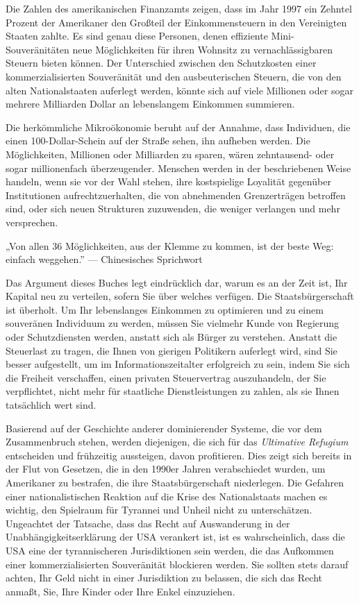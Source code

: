 \documentclass[
  a5paper,
  smalldemyvopaper,10pt,twoside,onecolumn,openright,extrafontsizes,hidelinks]{memoir}
\renewenvironment{quote}%
               {\list{}{\rightmargin=.6cm\leftmargin=.6cm}%
                \itshape \item[]}%
               {\endlist}
\begin{document}
Die Zahlen des amerikanischen Finanzamts zeigen, dass im Jahr 1997 ein
Zehntel Prozent der Amerikaner den Großteil der Einkommensteuern in den
Vereinigten Staaten zahlte. Es sind genau diese Personen, denen
effiziente Mini-Souveränitäten neue Möglichkeiten für ihren Wohnsitz zu
vernachlässigbaren Steuern bieten können. Der Unterschied zwischen den
Schutzkosten einer kommerzialisierten Souveränität und den
ausbeuterischen Steuern, die von den alten Nationalstaaten auferlegt
werden, könnte sich auf viele Millionen oder sogar mehrere Milliarden
Dollar an lebenslangem Einkommen summieren.

Die herkömmliche Mikroökonomie beruht auf der Annahme, dass Individuen,
die einen 100-Dollar-Schein auf der Straße sehen, ihn aufheben werden.
Die Möglichkeiten, Millionen oder Milliarden zu sparen, wären
zehntausend- oder sogar millionenfach überzeugender. Menschen werden in
der beschriebenen Weise handeln, wenn sie vor der Wahl stehen, ihre
kostspielige Loyalität gegenüber Institutionen aufrechtzuerhalten, die
von abnehmenden Grenzerträgen betroffen sind, oder sich neuen Strukturen
zuzuwenden, die weniger verlangen und mehr versprechen.

\begin{quote}
„Von allen 36 Möglichkeiten, aus der Klemme zu kommen, ist der beste
Weg: einfach weggehen.'' --- Chinesisches Sprichwort
\end{quote}

Das Argument dieses Buches legt eindrücklich dar, warum es an der Zeit
ist, Ihr Kapital neu zu verteilen, sofern Sie über welches verfügen. Die
Staatsbürgerschaft ist überholt. Um Ihr lebenslanges Einkommen zu
optimieren und zu einem souveränen Individuum zu werden, müssen Sie
vielmehr Kunde von Regierung oder Schutzdiensten werden, anstatt sich
als Bürger zu verstehen. Anstatt die Steuerlast zu tragen, die Ihnen von
gierigen Politikern auferlegt wird, sind Sie besser aufgestellt, um im
Informationszeitalter erfolgreich zu sein, indem Sie sich die Freiheit
verschaffen, einen privaten Steuervertrag auszuhandeln, der Sie
verpflichtet, nicht mehr für staatliche Dienstleistungen zu zahlen, als
sie Ihnen tatsächlich wert sind.

Basierend auf der Geschichte anderer dominierender Systeme, die vor dem
Zusammenbruch stehen, werden diejenigen, die sich für das
\emph{Ultimative Refugium} entscheiden und frühzeitig aussteigen, davon
profitieren. Dies zeigt sich bereits in der Flut von Gesetzen, die in
den 1990er Jahren verabschiedet wurden, um Amerikaner zu bestrafen, die
ihre Staatsbürgerschaft niederlegen. Die Gefahren einer
nationalistischen Reaktion auf die Krise des Nationalstaats machen es
wichtig, den Spielraum für Tyrannei und Unheil nicht zu unterschätzen.
Ungeachtet der Tatsache, dass das Recht auf Auswanderung in der
Unabhängigkeitserklärung der USA verankert ist, ist es wahrscheinlich,
dass die USA eine der tyrannischeren Jurisdiktionen sein werden, die das
Aufkommen einer kommerzialisierten Souveränität blockieren werden. Sie
sollten stets darauf achten, Ihr Geld nicht in einer Jurisdiktion zu
belassen, die sich das Recht anmaßt, Sie, Ihre Kinder oder Ihre Enkel
einzuziehen.
\end{document}
